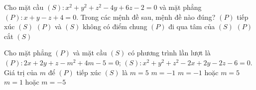 \begin{ex}%
	Cho mặt cầu $(S): x^2+y^2+z^2-4y+6z-2=0$ và mặt phẳng $(P)\colon x+y-z+4=0$. Trong các mệnh đề sau, mệnh đề nào đúng?
	\choice
	{ $(P)$ tiếp xúc $(S)$}
	{\True $(P)$ và $(S)$ không có điểm chung}
	{$(P)$ đi qua tâm của $(S)$}
	{$(P)$ cắt $(S)$}
\end{ex}
\begin{ex}%
	Cho mặt phẳng $(P)$ và mặt cầu $(S)$ có phương trình lần lượt là $(P)\colon 2x+2y+z-m^2+4m-5=0$; $(S)\colon x^2+y^2+z^2-2x+2y-2z-6=0$. Giá trị của $m$ để $(P)$ tiếp xúc $(S)$ là
	\choice
	{$m=5$}
	{$m=-1$}
	{\True $m=-1$ hoặc $m=5$}
	{$m=1$ hoặc $m=-5$}
\end{ex}
